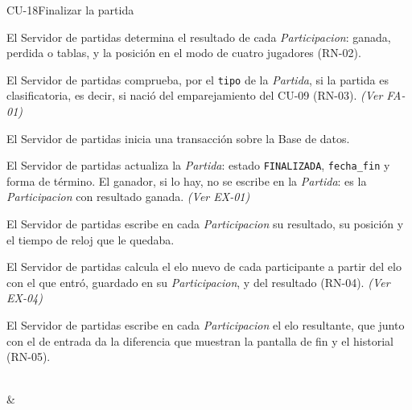 \begin{fichacu}{CU-18}{Finalizar la partida}
{\begin{cuenum}[start=1]
      \item El Servidor de partidas determina el resultado de cada \textit{Participacion}: ganada, perdida o tablas, y la posición en el modo de cuatro jugadores (\mbox{RN-02}).
      \item El Servidor de partidas comprueba, por el \texttt{tipo} de la \textit{Partida}, si la partida es clasificatoria, es decir, si nació del emparejamiento del \mbox{CU-09} (\mbox{RN-03}). \textit{(Ver \mbox{FA-01})}
      \item El Servidor de partidas inicia una transacción sobre la Base de datos.
      \item El Servidor de partidas actualiza la \textit{Partida}: estado \texttt{FINALIZADA}, \texttt{fecha\_\allowbreak{}fin} y forma de término. El ganador, si lo hay, no se escribe en la \textit{Partida}: es la \textit{Participacion} con resultado ganada. \textit{(Ver \mbox{EX-01})}
      \item El Servidor de partidas escribe en cada \textit{Participacion} su resultado, su posición y el tiempo de reloj que le quedaba.
      \item El Servidor de partidas calcula el elo nuevo de cada participante a partir del elo con el que entró, guardado en su \textit{Participacion}, y del resultado (\mbox{RN-04}). \textit{(Ver \mbox{EX-04})}
      \item El Servidor de partidas escribe en cada \textit{Participacion} el elo resultante, que junto con el de entrada da la diferencia que muestran la pantalla de fin y el historial (\mbox{RN-05}).
    \end{cuenum}} \\
   & 
\end{fichacu}
